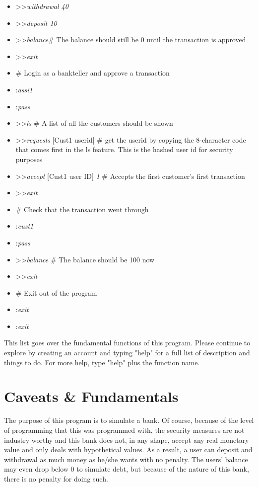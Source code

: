 \documentclass[letterpaper,10pt,english]{sphinxmanual}
\begin{document}
\begin{itemize}
\item{>>\textit{withdrawal 40}}
\item{>>\textit{deposit 10}}
\item{>>\textit{balance}\# The balance should still be 0 until the transaction is approved}
\item{>>\textit{exit}}
\item{\# Login as a bankteller and approve a transaction}
\item{:\textit{assi1}}
\item{:\textit{pass}}
\item{>>\textit{ls} \# A list of all the customers should be shown}
\item{>>\textit{requests }[Cust1 userid] \# get the userid by copying the 8-character code that comes first in the ls feature.  This is the hashed user id for security purposes }
\item{>>\textit{accept} [Cust1 user ID] \textit{1} \# Accepts the first customer's first transaction}
\item{>>\textit{exit}}
\item{\# Check that the transaction went through}
\item{:\textit{cust1}}
\item{:\textit{pass}}
\item{>>\textit{balance} \# The balance should be 100 now}
\item{>>\textit{exit}}
\item{\# Exit out of the program}
\item{:\textit{exit}}
\item{:\textit{exit}}
\end{itemize}
This list goes over the fundamental functions of this program.  Please continue to explore by creating an account and typing "help" for a full list of description and things to do.  For more help, type "help" plus the function name.

\newpage

\section{Caveats \& Fundamentals}
\label{\detokenize{intro:example}}\label{\detokenize{intro::doc}}
The purpose of this program is to simulate a bank.  Of course, because of the level of programming that this was programmed with, the security measures are not industry-worthy and this bank does not, in any shape, accept any real monetary value and only deals with hypothetical values.  As a result, a user can deposit and withdrawal as much money as he/she wants with no penalty.  The users' balance may even drop below 0 to simulate debt, but because of the nature of this bank, there is no penalty for doing such.
\end{document}
